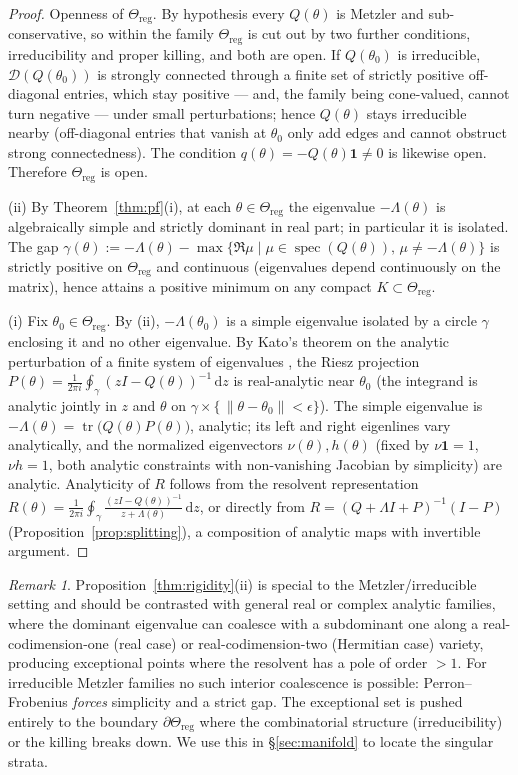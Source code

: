 \documentclass[11pt,reqno]{amsart}
\theoremstyle{plain}
\theoremstyle{definition}
\theoremstyle{remark}
\newtheorem{remark}[theorem]{Remark}
\newcommand{\Reg}{\Theta_{\mathrm{reg}}}
\newcommand{\one}{\mathbf{1}}
\newcommand{\dgraph}{\mathcal{D}}
\newcommand{\dd}{\mathrm{d}}
\DeclareMathOperator{\spec}{spec}
\DeclareMathOperator{\tr}{tr}
\begin{document}
\begin{proof}
Openness of $\Reg$. By hypothesis every $Q(\theta)$ is Metzler and
sub-conservative, so within the family $\Reg$ is cut out by two further conditions,
irreducibility and proper killing, and both are open. If $Q(\theta_0)$ is
irreducible, $\dgraph(Q(\theta_0))$ is strongly connected through a finite set of
strictly positive off-diagonal entries, which stay positive --- and, the family
being cone-valued, cannot turn negative --- under small perturbations; hence
$Q(\theta)$ stays irreducible nearby (off-diagonal entries that vanish at
$\theta_0$ only add edges and cannot obstruct strong connectedness). The condition
$q(\theta)=-Q(\theta)\one\neq 0$ is likewise open. Therefore $\Reg$ is open.

(ii) By Theorem~\ref{thm:pf}(i), at each $\theta\in\Reg$ the eigenvalue
$-\Lambda(\theta)$ is algebraically simple and strictly dominant in real part; in
particular it is isolated. The gap $\gamma(\theta):=-\Lambda(\theta)-\max\{\Re\mu\mid
\mu\in\spec(Q(\theta)),\,\mu\neq-\Lambda(\theta)\}$ is strictly positive on $\Reg$
and continuous (eigenvalues depend continuously on the matrix), hence attains a
positive minimum on any compact $K\subset\Reg$.

(i) Fix $\theta_0\in\Reg$. By (ii), $-\Lambda(\theta_0)$ is a simple eigenvalue
isolated by a circle $\gamma$ enclosing it and no other eigenvalue. By Kato's
theorem on the analytic perturbation of a finite system of eigenvalues
\cite[Ch.~II, \S1.8 and Ch.~VII, \S1.3]{Kato1995}, the Riesz projection
$P(\theta)=\frac{1}{2\pi i}\oint_{\gamma}(zI-Q(\theta))^{-1}\,\dd z$ is
real-analytic near $\theta_0$ (the integrand is analytic jointly in $z$ and
$\theta$ on $\gamma\times\{\,\|\theta-\theta_0\|<\epsilon\}$). The simple eigenvalue
is $-\Lambda(\theta)=\tr\bigl(Q(\theta)P(\theta)\bigr)$, analytic; its left and
right eigenlines vary analytically, and the normalized eigenvectors
$\nu(\theta),h(\theta)$ (fixed by $\nu\one=1$, $\nu h=1$, both analytic
constraints with non-vanishing Jacobian by simplicity) are analytic. Analyticity
of $R$ follows from the resolvent representation $R(\theta)=\frac{1}{2\pi
i}\oint_{\gamma}\frac{(zI-Q(\theta))^{-1}}{z+\Lambda(\theta)}\,\dd z$, or directly
from $R=(Q+\Lambda I+P)^{-1}(I-P)$ (Proposition~\ref{prop:splitting}), a composition
of analytic maps with invertible argument.
\end{proof}

\begin{remark}
Proposition~\ref{thm:rigidity}(ii) is special to the Metzler/irreducible setting and
should be contrasted with general real or complex analytic families, where the
dominant eigenvalue can coalesce with a subdominant one along a real-codimension-one
(real case) or real-codimension-two (Hermitian case) variety, producing
exceptional points where the resolvent has a pole of order $>1$. For irreducible
Metzler families no such interior coalescence is possible: Perron--Frobenius
\emph{forces} simplicity and a strict gap. The exceptional set is pushed entirely
to the boundary $\partial\Reg$ where the combinatorial structure (irreducibility)
or the killing breaks down. We use this in \S\ref{sec:manifold} to locate the
singular strata.
\end{remark}
\end{document}

